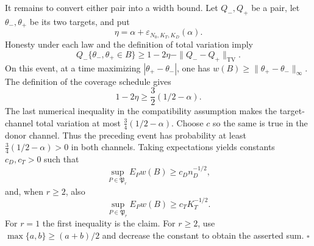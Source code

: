 It remains to convert either pair into a width bound.  Let \(Q_-,Q_+\) be a pair, let \(\theta_-,\theta_+\) be its two targets, and put
\[
 \eta=\alpha+\varepsilon_{N_0,K_T,K_D}(\alpha).
\]
Honesty under each law and the definition of total variation imply
\[
 Q_-\{\theta_-,\theta_+\in B\}
 \ge1-2\eta-\|Q_--Q_+\|_{\mathrm{TV}}.
\]
On this event, at a time maximizing \(|\theta_+-\theta_-|\), one has \(w(B)\ge\|\theta_+-\theta_-\|_\infty\).  The definition of the coverage schedule gives
\[
 1-2\eta\ge\frac32(1/2-\alpha).
\]
The last numerical inequality in the compatibility assumption makes the target-channel total variation at most \(\frac34(1/2-\alpha)\).  Choose \(c\) so the same is true in the donor channel.  Thus the preceding event has probability at least \(\frac34(1/2-\alpha)>0\) in both channels.  Taking expectations yields constants \(c_D,c_T>0\) such that
\[
 \sup_{P\in\mathfrak P_r}E_Pw(B)\ge c_Dn_D^{-1/2},
\]
and, when \(r\ge2\), also
\[
 \sup_{P\in\mathfrak P_r}E_Pw(B)\ge c_TK_T^{-1/2}.
\]
For \(r=1\) the first inequality is the claim.  For \(r\ge2\), use \(\max\{a,b\}\ge(a+b)/2\) and decrease the constant to obtain the asserted sum. \(\square\)